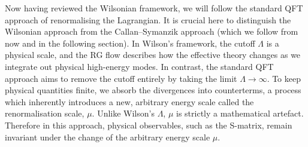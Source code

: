 Now having reviewed the Wilsonian framework, we will follow the standard QFT approach of renormalising the Lagrangian. It is crucial here to distinguish the Wilsonian approach from the Callan--Symanzik approach (which we follow from now and in the following section). In Wilson's framework, the cutoff $\Lambda$ is a physical scale, and the RG flow describes how the effective theory changes as we integrate out physical high-energy modes. In contrast, the standard QFT approach aims to remove the cutoff entirely by taking the limit $\Lambda\to\infty$. To keep physical quantities finite, we absorb the divergences into counterterms, a process which inherently introduces a new, arbitrary energy scale called the renormalisation scale, $\mu$. Unlike Wilson's $\Lambda$, $\mu$ is strictly a mathematical artefact. Therefore in this approach, physical observables, such as the S-matrix, remain invariant under the change of the arbitrary energy scale $\mu$. 

